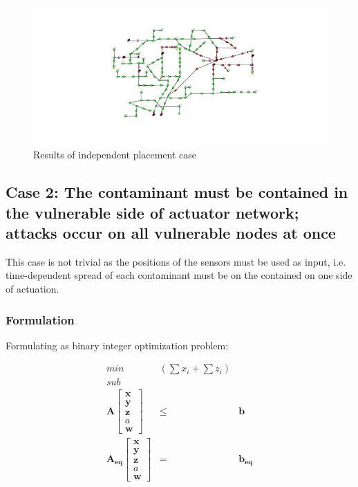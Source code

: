 \documentclass[authoryear,preprint,review,12pt]{elsarticle}
\begin{document}
\begin{figure}[ht]
\begin{centering}
\includegraphics[width=\linewidth]{images/multiobj_indep}\caption{Results of independent placement case}

\par\end{centering}

\end{figure}







\subsection{Case 2: The contaminant must be contained in the vulnerable side
of actuator network; attacks occur on all vulnerable nodes at once}

This case is not trivial as the positions of the sensors must be used
as input, i.e. time-dependent spread of each contaminant must be on the contained on one side of actuation.


\subsubsection{Formulation}

Formulating as binary integer optimization problem:

\begin{eqnarray*}
min & (\sum x_{i}+\sum z_{i})\\
sub\\
\mathbf{A}\left[\begin{array}{c}
\mathbf{x}\\
\mathbf{y}\\
\mathbf{z}\\
a\\
\mathbf{w}
\end{array}\right] & \leq & \mathbf{b}\\
\mathbf{A_{eq}}\left[\begin{array}{c}
\mathbf{x}\\
\mathbf{y}\\
\mathbf{z}\\
a\\
\mathbf{w}
\end{array}\right] & = & \mathbf{b_{eq}}
\end{eqnarray*}
\end{document}
